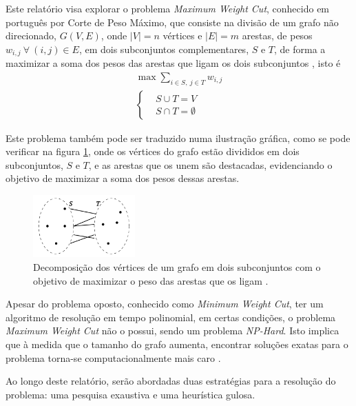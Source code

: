 \documentclass[mirror, portugues]{revdetua}
\begin{document}
Este relatório visa explorar o problema \textit{Maximum Weight Cut}, conhecido em português por Corte de Peso Máximo, que consiste na divisão de um grafo não direcionado, $G(V, E)$, onde $|V| = n$ vértices e $|E| = m$ arestas, de pesos $w_{i,j}\ \forall\ (i,j) \in E$, em dois subconjuntos complementares, $S$ e $T$, de forma a maximizar a soma dos pesos das arestas que ligam os dois subconjuntos \cite{SC03}, isto é
\begin{equation*}
    \begin{split}
        \max \sum_{i \in S,\ j \in T} w_{i,j} \\ 
        \left\{\begin{split}
            &S \cup T = V \\
            &S \cap T = \emptyset
        \end{split}\right.
    \end{split}
\end{equation*}

Este problema também pode ser traduzido numa ilustração gráfica, como se pode verificar na figura \ref{fig:problem}, onde os vértices do grafo estão divididos em dois subconjuntos, $S$ e $T$, e as arestas que os unem são destacadas, evidenciando o objetivo de maximizar a soma dos pesos dessas arestas.

\begin{figure}[h]
    \centering
    \includegraphics[width=0.35\textwidth]{../assets/problem.png}
    \caption{Decomposição dos vértices de um grafo em dois subconjuntos com o objetivo de maximizar o peso das arestas que os ligam \cite{SS23}.}
    \label{fig:problem}
\end{figure}

Apesar do problema oposto, conhecido como \textit{Minimum Weight Cut}, ter um algoritmo de resolução em tempo polinomial, em certas condições, o problema \textit{Maximum Weight Cut} não o possui, sendo um problema \textit{NP-Hard}. Isto implica que à medida que o tamanho do grafo aumenta, encontrar soluções exatas para o problema torna-se computacionalmente mais caro \cite{SS23}.

Ao longo deste relatório, serão abordadas duas estratégias para a resolução do problema: uma pesquisa exaustiva e uma heurística gulosa.
\end{document}
